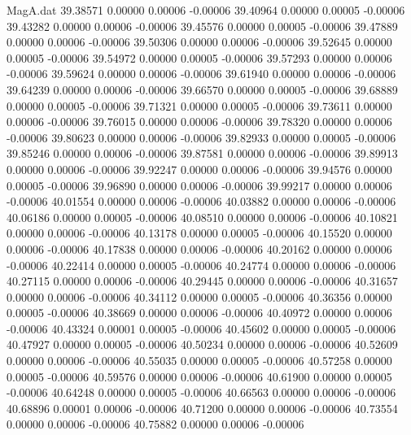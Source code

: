 \begin{filecontents}{MagA.dat}
  39.38571    0.00000    0.00006   -0.00006
  39.40964    0.00000    0.00005   -0.00006
  39.43282    0.00000    0.00006   -0.00006
  39.45576    0.00000    0.00005   -0.00006
  39.47889    0.00000    0.00006   -0.00006
  39.50306    0.00000    0.00006   -0.00006
  39.52645    0.00000    0.00005   -0.00006
  39.54972    0.00000    0.00005   -0.00006
  39.57293    0.00000    0.00006   -0.00006
  39.59624    0.00000    0.00006   -0.00006
  39.61940    0.00000    0.00006   -0.00006
  39.64239    0.00000    0.00006   -0.00006
  39.66570    0.00000    0.00005   -0.00006
  39.68889    0.00000    0.00005   -0.00006
  39.71321    0.00000    0.00005   -0.00006
  39.73611    0.00000    0.00006   -0.00006
  39.76015    0.00000    0.00006   -0.00006
  39.78320    0.00000    0.00006   -0.00006
  39.80623    0.00000    0.00006   -0.00006
  39.82933    0.00000    0.00005   -0.00006
  39.85246    0.00000    0.00006   -0.00006
  39.87581    0.00000    0.00006   -0.00006
  39.89913    0.00000    0.00006   -0.00006
  39.92247    0.00000    0.00006   -0.00006
  39.94576    0.00000    0.00005   -0.00006
  39.96890    0.00000    0.00006   -0.00006
  39.99217    0.00000    0.00006   -0.00006
  40.01554    0.00000    0.00006   -0.00006
  40.03882    0.00000    0.00006   -0.00006
  40.06186    0.00000    0.00005   -0.00006
  40.08510    0.00000    0.00006   -0.00006
  40.10821    0.00000    0.00006   -0.00006
  40.13178    0.00000    0.00005   -0.00006
  40.15520    0.00000    0.00006   -0.00006
  40.17838    0.00000    0.00006   -0.00006
  40.20162    0.00000    0.00006   -0.00006
  40.22414    0.00000    0.00005   -0.00006
  40.24774    0.00000    0.00006   -0.00006
  40.27115    0.00000    0.00006   -0.00006
  40.29445    0.00000    0.00006   -0.00006
  40.31657    0.00000    0.00006   -0.00006
  40.34112    0.00000    0.00005   -0.00006
  40.36356    0.00000    0.00005   -0.00006
  40.38669    0.00000    0.00006   -0.00006
  40.40972    0.00000    0.00006   -0.00006
  40.43324    0.00001    0.00005   -0.00006
  40.45602    0.00000    0.00005   -0.00006
  40.47927    0.00000    0.00005   -0.00006
  40.50234    0.00000    0.00006   -0.00006
  40.52609    0.00000    0.00006   -0.00006
  40.55035    0.00000    0.00005   -0.00006
  40.57258    0.00000    0.00005   -0.00006
  40.59576    0.00000    0.00006   -0.00006
  40.61900    0.00000    0.00005   -0.00006
  40.64248    0.00000    0.00005   -0.00006
  40.66563    0.00000    0.00006   -0.00006
  40.68896    0.00001    0.00006   -0.00006
  40.71200    0.00000    0.00006   -0.00006
  40.73554    0.00000    0.00006   -0.00006
  40.75882    0.00000    0.00006   -0.00006

\end{filecontents}
